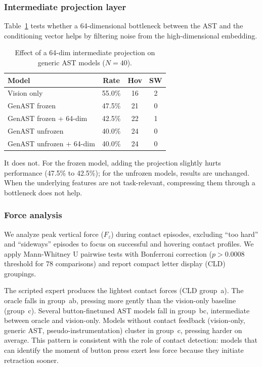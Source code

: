 \documentclass[conference]{IEEEtran}
\begin{document}
\subsubsection{Intermediate projection layer}

Table~\ref{tab:intermediate} tests whether a 64-dimensional bottleneck between the AST and the conditioning vector helps by filtering noise from the high-dimensional embedding.

\begin{table}[t]
\caption{Effect of a 64-dim intermediate projection on generic AST models ($N{=}40$).}
\label{tab:intermediate}
\begin{center}
\begin{tabular}{lccc}
\toprule
\textbf{Model} & \textbf{Rate} & \textbf{Hov} & \textbf{SW} \\
\midrule
Vision only & 55.0\% & 16 & 2 \\
\midrule
GenAST frozen & 47.5\% & 21 & 0 \\
GenAST frozen + 64-dim & 42.5\% & 22 & 1 \\
GenAST unfrozen & 40.0\% & 24 & 0 \\
GenAST unfrozen + 64-dim & 40.0\% & 24 & 0 \\
\bottomrule
\end{tabular}
\end{center}
\end{table}

It does not.
For the frozen model, adding the projection slightly hurts performance (47.5\% to 42.5\%); for the unfrozen models, results are unchanged.
When the underlying features are not task-relevant, compressing them through a bottleneck does not help.

\subsubsection{Force analysis}

We analyze peak vertical force ($F_z$) during contact episodes, excluding ``too hard'' and ``sideways'' episodes to focus on successful and hovering contact profiles.
We apply Mann-Whitney U pairwise tests with Bonferroni correction ($p > 0.0008$ threshold for 78 comparisons) and report compact letter display (CLD) groupings.

The scripted expert produces the lightest contact forces (CLD group~\textsf{a}).
The oracle falls in group~\textsf{ab}, pressing more gently than the vision-only baseline (group~\textsf{c}).
Several button-finetuned AST models fall in group~\textsf{bc}, intermediate between oracle and vision-only.
Models without contact feedback (vision-only, generic AST, pseudo-instrumentation) cluster in group~\textsf{c}, pressing harder on average.
This pattern is consistent with the role of contact detection: models that can identify the moment of button press exert less force because they initiate retraction sooner.
\end{document}

